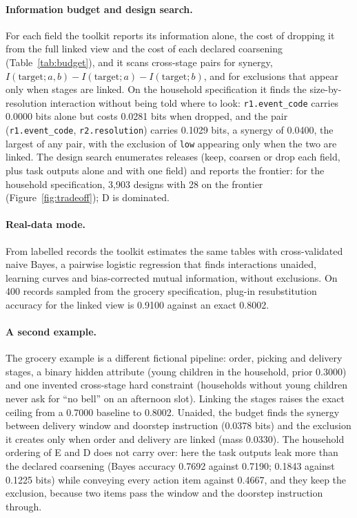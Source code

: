 \documentclass[11pt]{article}
\newcommand{\code}[1]{\texttt{#1}}
\begin{document}
\paragraph{Information budget and design search.} For each field the toolkit reports its information alone, the cost of dropping it from the full linked view and the cost of each declared coarsening (Table~\ref{tab:budget}), and it scans cross-stage pairs for synergy, $I(\text{target}; a, b) - I(\text{target}; a) - I(\text{target}; b)$, and for exclusions that appear only when stages are linked. On the household specification it finds the size-by-resolution interaction without being told where to look: \code{r1.event\_code} carries 0.0000 bits alone but costs 0.0281 bits when dropped, and the pair (\code{r1.event\_code}, \code{r2.resolution}) carries 0.1029 bits, a synergy of 0.0400, the largest of any pair, with the exclusion of \code{low} appearing only when the two are linked. The design search enumerates releases (keep, coarsen or drop each field, plus task outputs alone and with one field) and reports the frontier: for the household specification, 3,903 designs with 28 on the frontier (Figure~\ref{fig:tradeoff}); D is dominated.

\paragraph{Real-data mode.} From labelled records the toolkit estimates the same tables with cross-validated naive Bayes, a pairwise logistic regression that finds interactions unaided, learning curves and bias-corrected mutual information, without exclusions. On 400 records sampled from the grocery specification, plug-in resubstitution accuracy for the linked view is 0.9100 against an exact 0.8002.

\paragraph{A second example.} The grocery example is a different fictional pipeline: order, picking and delivery stages, a binary hidden attribute (young children in the household, prior 0.3000) and one invented cross-stage hard constraint (households without young children never ask for ``no bell'' on an afternoon slot). Linking the stages raises the exact ceiling from a 0.7000 baseline to 0.8002. Unaided, the budget finds the synergy between delivery window and doorstep instruction (0.0378 bits) and the exclusion it creates only when order and delivery are linked (mass 0.0330). The household ordering of E and D does not carry over: here the task outputs leak more than the declared coarsening (Bayes accuracy 0.7692 against 0.7190; 0.1843 against 0.1225 bits) while conveying every action item against 0.4667, and they keep the exclusion, because two items pass the window and the doorstep instruction through.
\end{document}
